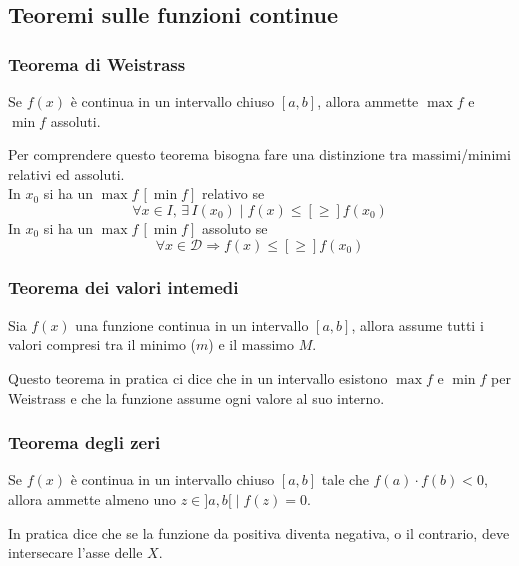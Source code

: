 \subsection{Teoremi sulle funzioni continue}
\subsubsection{Teorema di Weistrass}
\begin{weistrass}
  Se $f(x)$ è continua in un intervallo chiuso ${[a,b]}$, allora ammette $\max f$ e $\min f$
  assoluti.
\end{weistrass}
Per comprendere questo teorema bisogna fare una distinzione tra massimi/minimi relativi ed
assoluti.\\
In $x_0$ si ha un $\max f\,[\min f]$ relativo se
\begin{equation*}
  \forall x\in I,\,\exists\,I(x_0)\mid f(x)\leq[\geq]f(x_0)
\end{equation*}
In $x_0$ si ha un $\max f\,[\min f]$ assoluto se
\begin{equation*}
  \forall x\in\mathscr{D}\Rightarrow f(x)\leq[\geq]f(x_0)
\end{equation*}

\subsubsection{Teorema dei valori intemedi}
\begin{valoriIntermedi}
  Sia $f(x)$ una funzione continua in un intervallo ${[a,b]}$, allora assume tutti i valori
  compresi tra il minimo ($m$) e il massimo $M$.
\end{valoriIntermedi}
Questo teorema in pratica ci dice che in un intervallo esistono $\max f$ e $\min f$ per Weistrass
e che la funzione assume ogni valore al suo interno.

\subsubsection{Teorema degli zeri}
\begin{zeri}
  Se $f(x)$ è continua in un intervallo chiuso ${[a,b]}$ tale che $f(a)\cdot f(b)<0$, 
  allora ammette almeno uno $z\in{]a,b[}\mid f(z)=0$.
\end{zeri}
In pratica dice che se la funzione da positiva diventa negativa, o il contrario, deve intersecare
l'asse delle $X$.
